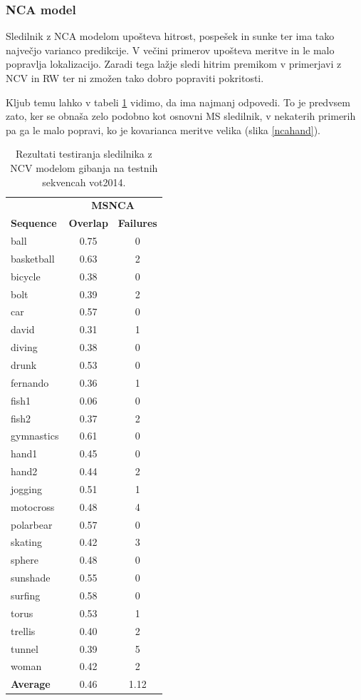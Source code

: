 \documentclass[a4paper]{article}
\begin{document}
\subsubsection{NCA model}
Sledilnik z NCA modelom upošteva hitrost, pospešek in sunke ter ima tako največjo varianco predikcije. V večini primerov upošteva meritve in le malo popravlja lokalizacijo. Zaradi tega lažje sledi hitrim premikom v primerjavi z  NCV in RW ter ni zmožen tako dobro popraviti pokritosti.

Kljub temu lahko v tabeli \ref{tabelanca} vidimo, da ima najmanj odpovedi. To je predvsem zato, ker se obnaša zelo podobno kot osnovni MS sledilnik, v nekaterih primerih pa ga le malo popravi, ko je kovarianca meritve velika (slika \ref{ncahand}). 

\begin{table}[h!]
	\begin{center}
		\begin{tabular}{l c c}
			\hline 
			& \multicolumn{2}{c}{{\bf MSNCA}}\\
			{\bf Sequence} & {\bf Overlap} & {\bf Failures} \\
			\hline 
			ball & 0.75 & 0\\
			basketball & 0.63 & 2\\
			bicycle & 0.38 & 0\\
			bolt & 0.39 & 2\\
			car & 0.57 & 0\\
			david & 0.31 & 1\\
			diving & 0.38 & 0\\
			drunk & 0.53 & 0\\
			fernando & 0.36 & 1\\
			fish1 & 0.06 & 0\\
			fish2 & 0.37 & 2\\
			gymnastics & 0.61 & 0\\
			hand1 & 0.45 & 0\\
			hand2 & 0.44 & 2\\
			jogging & 0.51 & 1\\
			motocross & 0.48 & 4\\
			polarbear & 0.57 & 0\\
			skating & 0.42 & 3\\
			sphere & 0.48 & 0\\
			sunshade & 0.55 & 0\\
			surfing & 0.58 & 0\\
			torus & 0.53 & 1\\
			trellis & 0.40 & 2\\
			tunnel & 0.39 & 5\\
			woman & 0.42 & 2\\
			\hline 
			{\bf Average} & 0.46 & 1.12\\
			\hline 
		\end{tabular}
	\end{center}
	\caption{Rezultati testiranja sledilnika z NCV modelom gibanja na testnih sekvencah vot2014.}
	\label{tabelanca}
\end{table}
\end{document}
